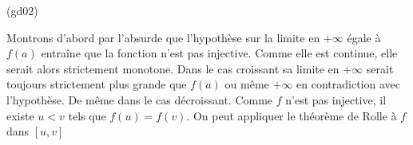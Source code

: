 \begin{tiny}(gd02)\end{tiny} Montrons d'abord par l'absurde que l'hypothèse sur la limite en $+\infty$ égale à $f(a)$ entraîne que la fonction n'est pas injective.\newline
Comme elle est continue, elle serait alors strictement monotone. Dans le cas croissant sa limite en $+\infty$ serait toujours strictement plus grande que $f(a)$ ou même $+\infty$ en contradiction avec l'hypothèse. De même dans le cas décroissant.\newline
Comme $f$ n'est pas injective, il existe $u<v$ tels que $f(u)=f(v)$. On peut appliquer le théorème de Rolle à $f$ dans $[u,v]$